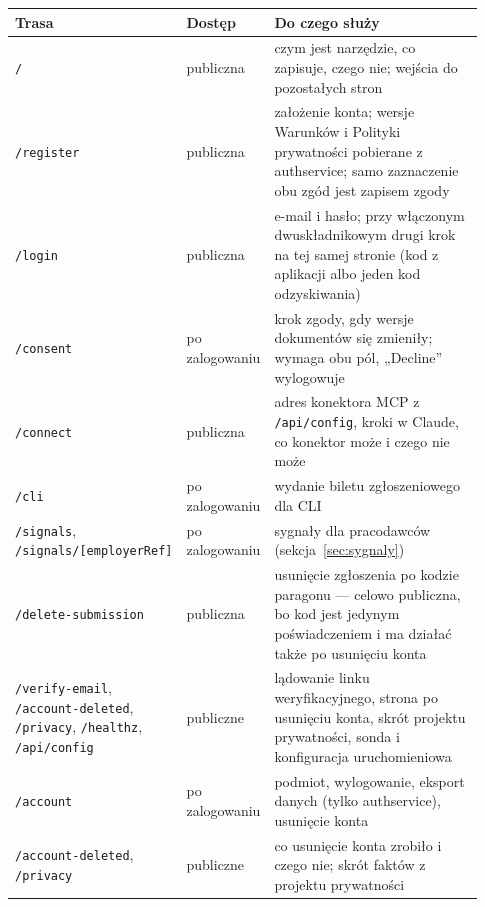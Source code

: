 {\begin{center}
\small
\begin{longtable}{@{}>{\raggedright\arraybackslash}p{0.2\linewidth}>{\raggedright\arraybackslash}p{0.13\linewidth}>{\raggedright\arraybackslash}p{0.6\linewidth}@{}}
\toprule
Trasa & Dostęp & Do czego służy \\
\midrule
\endhead
\texttt{/} & publiczna & czym jest narzędzie, co zapisuje, czego nie; wejścia do pozostałych stron \\
\texttt{/register} & publiczna & założenie konta; wersje Warunków i Polityki prywatności pobierane z authservice; samo zaznaczenie obu zgód jest zapisem zgody \\
\texttt{/login} & publiczna & e-mail i hasło; przy włączonym dwuskładnikowym drugi krok na tej samej stronie (kod z aplikacji albo jeden kod odzyskiwania) \\
\texttt{/consent} & po zalogowaniu & krok zgody, gdy wersje dokumentów się zmieniły; wymaga obu pól, „Decline” wylogowuje \\
\texttt{/connect} & publiczna & adres konektora MCP z \texttt{/api/config}, kroki w Claude, co konektor może i czego nie może \\
\texttt{/cli} & po zalogowaniu & wydanie biletu zgłoszeniowego dla CLI \\
\texttt{/signals}, \texttt{/\allowbreak{}signals/\allowbreak{}[employerRef]} & po zalogowaniu & sygnały dla pracodawców (sekcja~\ref{sec:sygnaly}) \\
\texttt{/\allowbreak{}delete-\allowbreak{}submission} & publiczna & usunięcie zgłoszenia po kodzie paragonu --- celowo publiczna, bo kod jest jedynym poświadczeniem i ma działać także po usunięciu konta \\
\texttt{/verify-email}, \texttt{/account-deleted}, \texttt{/privacy}, \texttt{/healthz}, \texttt{/api/config} & publiczne & lądowanie linku weryfikacyjnego, strona po usunięciu konta, skrót projektu prywatności, sonda i konfiguracja uruchomieniowa \\
\texttt{/account} & po zalogowaniu & podmiot, wylogowanie, eksport danych (tylko authservice), usunięcie konta \\
\texttt{/\allowbreak{}account-\allowbreak{}deleted}, \texttt{/privacy} & publiczne & co usunięcie konta zrobiło i czego nie; skrót faktów z projektu prywatności \\
\bottomrule
\end{longtable}
\end{center}

}
